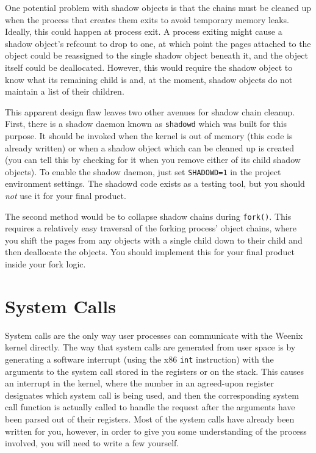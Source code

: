 One potential problem with shadow objects is that the chains must be cleaned up when the process that creates them exits to avoid temporary memory leaks. Ideally, this could happen at process exit. A process exiting might cause a shadow object's refcount to drop to one, at which point the pages attached to the object could be reassigned to the single shadow object beneath it, and the object itself could be deallocated. However, this would require the shadow object to know what its remaining child is and, at the moment, shadow objects do not maintain a list of their children.

This apparent design flaw leaves two other avenues for shadow chain cleanup. First, there is a shadow daemon known as \texttt{shadowd} which was built for this purpose. It should be invoked when the kernel is out of memory (this code is already written) or when a shadow object which can be cleaned up is created (you can tell this by checking for it when you remove either of its child shadow objects). To enable the shadow daemon, just set \texttt{SHADOWD=1} in the project environment settings. The shadowd code exists as a testing tool, but you should \emph{not} use it for your final product. 

The second method would be to collapse shadow chains during \texttt{fork()}. This requires a relatively easy traversal of the forking process' object chains, where you shift the pages from any objects with a single child down to their child and then deallocate the objects. You should implement this for your final product inside your fork logic. 

\section{System Calls}

System calls are the only way user processes can communicate with the Weenix kernel directly. The way that system calls are generated from user space is by generating a software interrupt (using the x86 \texttt{int} instruction) with the arguments to the system call stored in the registers or on the stack. This causes an interrupt in the kernel, where the number in an agreed-upon register designates which system call is being used, and then the corresponding system call function is actually called to handle the request after the arguments have been parsed out of their registers. Most of the system calls have already been written for you, however, in order to give you some understanding of the process involved, you will need to write a few yourself.


